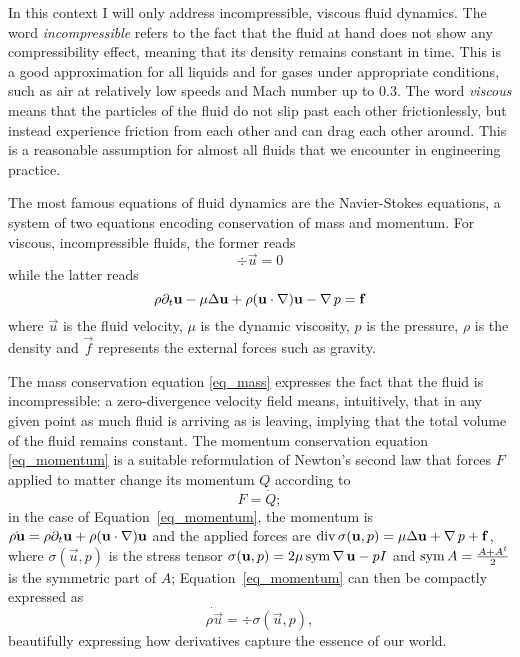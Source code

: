 In this context I will only address incompressible, viscous fluid
dynamics.
The word \emph{incompressible} refers to the fact that the fluid at hand
does not show any compressibility effect, meaning that its density
remains constant in time.
This is a good approximation for all liquids and for gases under appropriate conditions, such as air at relatively low speeds and Mach number up to \num{0.3}.
The word \emph{viscous} means that the particles of the fluid do not slip
past each other frictionlessly, but instead experience friction from each
other and can drag each other around.
This is a reasonable assumption for almost all fluids that we encounter
in engineering practice.

The most famous equations of fluid dynamics are the Navier-Stokes
equations, a system of two equations encoding conservation of mass and momentum.
For viscous, incompressible fluids, the former reads
\begin{equation}
  \div \vec{u} = 0
  \label{eq_mass}
\end{equation}
while the latter reads
\begin{equation}
  \rho\partial_{t} \mathbf{u} - \mu \Delta \mathbf{u} + \rho(\mathbf{u} \cdot \operatorname{\nabla})
  \mathbf{u} - \operatorname{\nabla} p = \mathbf{f}
  \label{eq_momentum}
\end{equation}
where \(\vec{u}\) is the fluid velocity, \(\mu\) is the dynamic
viscosity, \(p\) is the pressure, \(\rho\) is the density and \(\vec{f}\)
represents the external forces such as gravity.

The mass conservation equation \eqref{eq_mass} expresses the fact that
the fluid is incompressible: a zero-divergence velocity field means,
intuitively, that in any given point as much fluid is arriving as is
leaving, implying that the total volume of the fluid remains constant.
The momentum conservation equation \eqref{eq_momentum} is a suitable
reformulation of Newton's second law that forces \(F\) applied to matter change
its momentum \(Q\) according to
\begin{equation}
  F = \dot Q;
  \label{eq_newtonSecondLaw}
\end{equation}
in the case of Equation~\eqref{eq_momentum}, the momentum is \(\dot
{\rho \mathbf{u}} = \rho \partial_{t} \mathbf{u} + \rho (\mathbf{u} \cdot \operatorname{\nabla})
\mathbf{u}\) and the applied forces are \(\operatorname{div} \sigma(\mathbf{u}, p) = \mu
\Delta \mathbf{u} + \operatorname{\nabla} p + \mathbf{f}\), where \(\sigma(\vec{u}, p)\) is the
stress tensor \(\sigma(\mathbf{u}, p) = 2 \mu \operatorname{sym}\operatorname{\nabla} \mathbf{u} - pI\) and \(\operatorname{sym} A = \frac{A + A^t}{2}\) is the symmetric part of \(A\);
Equation~\eqref{eq_momentum} can then be compactly expressed as
\begin{equation}
  \dot {\rho \vec{u}} = \div \sigma(\vec{u}, p),
  \label{eq_momentumDerivatives}
\end{equation}
beautifully expressing how derivatives capture the essence of our world.

